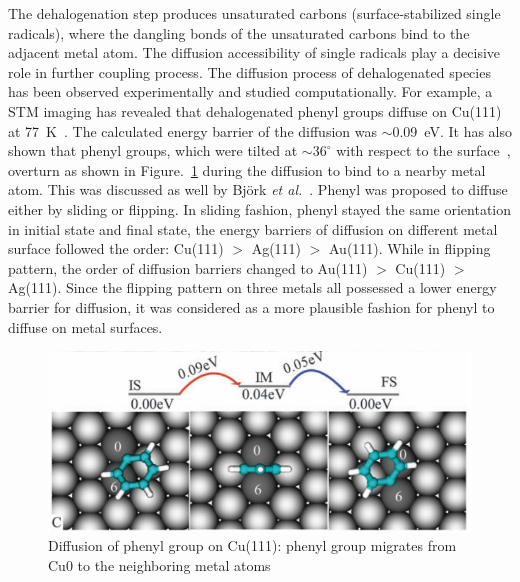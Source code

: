 \documentclass[%
 reprint,
 amsmath,amssymb,
 aps,
prb,
]{revtex4-1}
\begin{document}
The dehalogenation step produces unsaturated carbons (surface-stabilized single radicals), where the dangling bonds of the unsaturated carbons bind to the adjacent metal atom. The diffusion accessibility of single radicals play a decisive role in further coupling process. 
%
The diffusion process of dehalogenated species has been observed experimentally and studied computationally. For example, a STM imaging has revealed that dehalogenated phenyl groups diffuse on Cu(111) at 77~K~\cite{langm01}. The calculated energy barrier of the diffusion was $\sim$0.09~eV. It has also shown that phenyl groups, which were tilted at $\sim 36^\circ$ with respect to the surface~\cite{pccp2010}, overturn as shown in Figure.~\ref{fig:4} during the diffusion to bind to a nearby metal atom. This was discussed as well by Björk \textit{et al.}~\cite{jacs2013}. Phenyl was proposed to diffuse either by sliding or flipping. In sliding fashion, phenyl stayed the same orientation in initial state and final state, the energy barriers of diffusion on different metal surface followed the order: Cu(111) $>$ Ag(111) $>$ Au(111). While in flipping pattern, the order of diffusion barriers changed to Au(111) $>$ Cu(111) $>$ Ag(111). Since the flipping pattern on three metals all possessed a lower energy barrier for diffusion, it was considered as a more plausible fashion for phenyl to diffuse on metal surfaces.

\begin{figure}[htb]
\centering
\includegraphics[width=0.75\columnwidth]{Fig/overturn.png}
\caption{Diffusion of phenyl group on Cu(111): phenyl group migrates from Cu0 to the neighboring metal atoms} %
\label{fig:4}
\end{figure}
\end{document}
